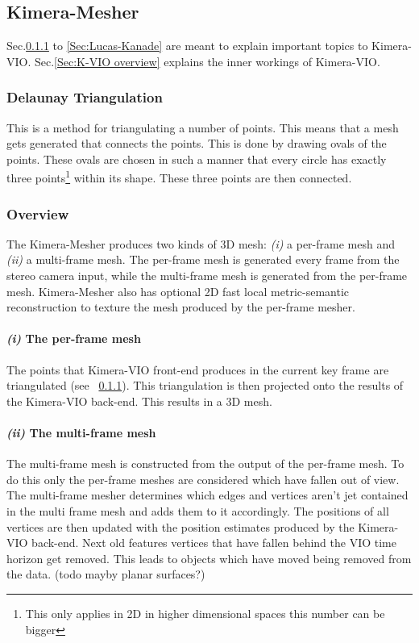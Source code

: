 \documentclass[11pt,a4paper]{article}
\begin{document}
\subsection{Kimera-Mesher}
Sec.\ref{pre:delaunay} to \ref{Sec:Lucas-Kanade} are meant to explain important topics to Kimera-VIO.
Sec.\ref{Sec:K-VIO overview} explains the inner workings of Kimera-VIO.
\subsubsection{Delaunay Triangulation} \label{pre:delaunay}
This is a method for triangulating a number of points. This means that a mesh gets generated that connects the points.
This is done by drawing ovals of the points. 
These ovals are chosen in such a manner that every circle has exactly three points\footnote{This only applies in 2D in higher dimensional spaces this number can be bigger} within its shape. 
These three points are then connected.  
\subsubsection{Overview}
The Kimera-Mesher produces two kinds of 3D mesh: \textit{(i)} a per-frame mesh and \textit{(ii)} a multi-frame mesh. The per-frame mesh is generated every frame from the stereo camera input, while the multi-frame mesh is generated from the per-frame mesh.
Kimera-Mesher also has optional 2D fast local metric-semantic reconstruction to texture the mesh produced by the per-frame mesher.
\paragraph{\textit{(i)} The per-frame mesh}
The points that Kimera-VIO front-end produces in the current key frame are triangulated (see ~\ref{pre:delaunay}).
This triangulation is then projected onto the results of the Kimera-VIO back-end. This results in a 3D mesh. 

\paragraph{\textit{(ii)} The multi-frame mesh}
The multi-frame mesh is constructed from the output of the per-frame mesh.
To do this only the per-frame meshes are considered which have fallen out of view.
The multi-frame mesher determines which edges and vertices aren't jet contained in the multi frame mesh and adds them to it accordingly. 
The positions of all vertices are then updated with the position estimates produced by the Kimera-VIO back-end.
Next old features vertices that have fallen behind the VIO time horizon get removed. 
This leads to objects which have moved being removed from the data. 
(todo mayby planar surfaces?)
\end{document}
